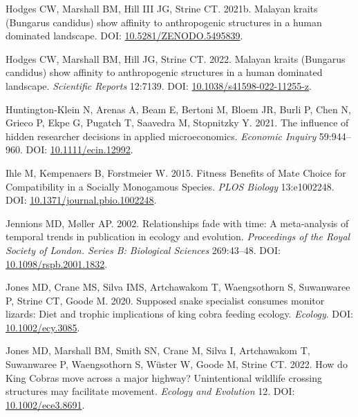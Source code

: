 \documentclass[10pt,a4paper]{article}
\newlength{\cslhangindent}
\newenvironment{CSLReferences}[2] %
 {\begin{list}{}{%
  \setlength{\itemindent}{0pt}
  \setlength{\leftmargin}{0pt}
  \setlength{\parsep}{0pt}
  \ifodd #1
   \setlength{\leftmargin}{\cslhangindent}
   \setlength{\itemindent}{-1\cslhangindent}
  \fi
  \setlength{\itemsep}{#2\baselineskip}}}
 {\end{list}}
\begin{document}
\begin{CSLReferences}{1}{0}
Hodges CW, Marshall BM, Hill III JG, Strine CT. 2021b. Malayan kraits ({Bungarus} candidus) show affinity to anthropogenic structures in a human dominated landscape. DOI: \href{https://doi.org/10.5281/ZENODO.5495839}{10.5281/ZENODO.5495839}.

Hodges CW, Marshall BM, Hill JG, Strine CT. 2022. Malayan kraits ({Bungarus} candidus) show affinity to anthropogenic structures in a human dominated landscape. \emph{Scientific Reports} 12:7139. DOI: \href{https://doi.org/10.1038/s41598-022-11255-z}{10.1038/s41598-022-11255-z}.

Huntington‐Klein N, Arenas A, Beam E, Bertoni M, Bloem JR, Burli P, Chen N, Grieco P, Ekpe G, Pugatch T, Saavedra M, Stopnitzky Y. 2021. The influence of hidden researcher decisions in applied microeconomics. \emph{Economic Inquiry} 59:944--960. DOI: \href{https://doi.org/10.1111/ecin.12992}{10.1111/ecin.12992}.

Ihle M, Kempenaers B, Forstmeier W. 2015. Fitness {Benefits} of {Mate} {Choice} for {Compatibility} in a {Socially} {Monogamous} {Species}. \emph{PLOS Biology} 13:e1002248. DOI: \href{https://doi.org/10.1371/journal.pbio.1002248}{10.1371/journal.pbio.1002248}.

Jennions MD, Møller AP. 2002. Relationships fade with time: A meta-analysis of temporal trends in publication in ecology and evolution. \emph{Proceedings of the Royal Society of London. Series B: Biological Sciences} 269:43--48. DOI: \href{https://doi.org/10.1098/rspb.2001.1832}{10.1098/rspb.2001.1832}.

Jones MD, Crane MS, Silva IMS, Artchawakom T, Waengsothorn S, Suwanwaree P, Strine CT, Goode M. 2020. Supposed snake specialist consumes monitor lizards: Diet and trophic implications of king cobra feeding ecology. \emph{Ecology}. DOI: \href{https://doi.org/10.1002/ecy.3085}{10.1002/ecy.3085}.

Jones MD, Marshall BM, Smith SN, Crane M, Silva I, Artchawakom T, Suwanwaree P, Waengsothorn S, Wüster W, Goode M, Strine CT. 2022. How do {King} {Cobras} move across a major highway? {Unintentional} wildlife crossing structures may facilitate movement. \emph{Ecology and Evolution} 12. DOI: \href{https://doi.org/10.1002/ece3.8691}{10.1002/ece3.8691}.


\end{CSLReferences}
\end{document}

